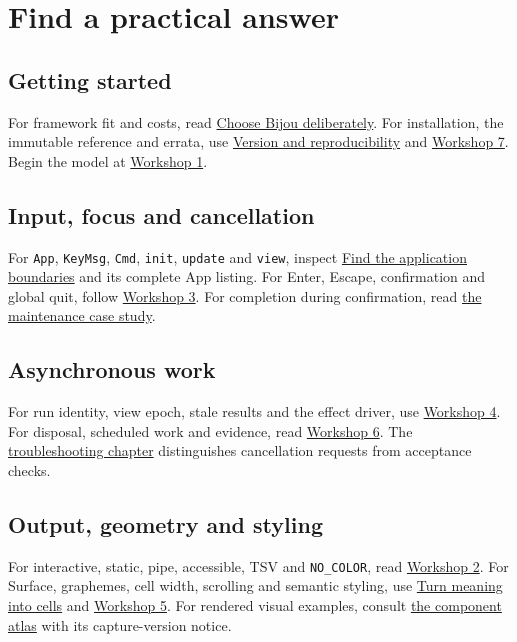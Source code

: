 \chapter{Find a practical answer}\label{book-topic-finder}

\section{Getting started}

For framework fit and costs, read \hyperref[teaching-fit]{Choose Bijou deliberately}. For installation, the immutable reference and errata, use \hyperref[book-reproducibility]{Version and reproducibility} and \hyperref[workshop-07]{Workshop 7}. Begin the model at \hyperref[workshop-01]{Workshop 1}.

\section{Input, focus and cancellation}

For \texttt{App}, \texttt{KeyMsg}, \texttt{Cmd}, \texttt{init}, \texttt{update} and \texttt{view}, inspect \hyperref[teaching-boundaries]{Find the application boundaries} and its complete App listing. For Enter, Escape, confirmation and global quit, follow \hyperref[workshop-03]{Workshop 3}. For completion during confirmation, read \hyperref[teaching-maintenance]{the maintenance case study}.

\section{Asynchronous work}

For run identity, view epoch, stale results and the effect driver, use \hyperref[workshop-04]{Workshop 4}. For disposal, scheduled work and evidence, read \hyperref[workshop-06]{Workshop 6}. The \hyperref[teaching-troubleshooting]{troubleshooting chapter} distinguishes cancellation requests from acceptance checks.

\section{Output, geometry and styling}

For interactive, static, pipe, accessible, TSV and \texttt{NO\_COLOR}, read \hyperref[workshop-02]{Workshop 2}. For Surface, graphemes, cell width, scrolling and semantic styling, use \hyperref[teaching-layout]{Turn meaning into cells} and \hyperref[workshop-05]{Workshop 5}. For rendered visual examples, consult \hyperref[component-atlas]{the component atlas} with its capture-version notice.

